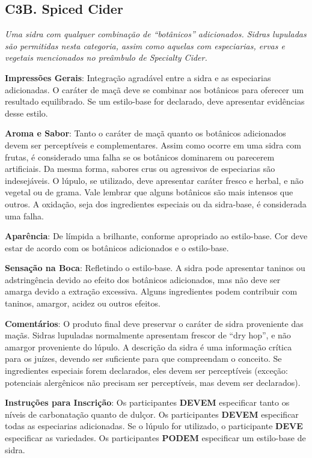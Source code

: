\subsection*{C3B. Spiced Cider}

\textit{Uma sidra com qualquer combinação de “botânicos” adicionados. Sidras lupuladas são permitidas nesta categoria, assim como aquelas com especiarias, ervas e vegetais mencionados no preâmbulo de Specialty Cider.}

\textbf{Impressões Gerais}: Integração agradável entre a sidra e as especiarias adicionadas. O caráter de maçã deve se combinar aos botânicos para oferecer um resultado equilibrado. Se um estilo-base for declarado, deve apresentar evidências desse estilo.

\textbf{Aroma e Sabor}: Tanto o caráter de maçã quanto os botânicos adicionados devem ser perceptíveis e complementares. Assim como ocorre em uma sidra com frutas, é considerado uma falha se os botânicos dominarem ou parecerem artificiais. Da mesma forma, sabores crus ou agressivos de especiarias são indesejáveis. O lúpulo, se utilizado, deve apresentar caráter fresco e herbal, e não vegetal ou de grama. Vale lembrar que alguns botânicos são mais intensos que outros. A oxidação, seja dos ingredientes especiais ou da sidra-base, é considerada uma falha.

\textbf{Aparência}: De límpida a brilhante, conforme apropriado ao estilo-base. Cor deve estar de acordo com os botânicos adicionados e o estilo-base.

\textbf{Sensação na Boca}: Refletindo o estilo-base. A sidra pode apresentar taninos ou adstringência devido ao efeito dos botânicos adicionados, mas não deve ser amarga devido a extração excessiva. Alguns ingredientes podem contribuir com taninos, amargor, acidez ou outros efeitos.

\textbf{Comentários}: O produto final deve preservar o caráter de sidra proveniente das maçãs. Sidras lupuladas normalmente apresentam frescor de “dry hop”, e não amargor proveniente do lúpulo. A descrição da sidra é uma informação crítica para os juízes, devendo ser suficiente para que compreendam o conceito. Se ingredientes especiais forem declarados, eles devem ser perceptíveis (exceção: potenciais alergênicos não precisam ser perceptíveis, mas devem ser declarados).

\textbf{Instruções para Inscrição}: Os participantes \textbf{DEVEM} especificar tanto os níveis de carbonatação quanto de dulçor. Os participantes \textbf{DEVEM} especificar todas as especiarias adicionadas. Se o lúpulo for utilizado, o participante \textbf{DEVE} especificar as variedades. Os participantes \textbf{PODEM} especificar um estilo-base de sidra.

